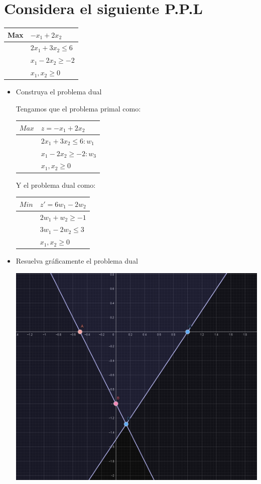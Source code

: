 \section{Considera el siguiente P.P.L}


    \begin{tabular}{|l|l|}
    \hline
        Max & $-x_1+2x_2$ \\ \hline
        ~ & $2x_1+3x_2\leq 6$ \\ \hline
        ~ & $x_1-2x_2\geq -2$\\ \hline
        ~ & $x_1,x_2\geq0$ \\ \hline
    \end{tabular}
    \begin{itemize}
        \item Construya el problema dual 
        
        Tengamos que el problema primal como:

    \begin{tabular}{|l|l|}
    \hline
        $Max$ & $z=-x_1+2x_2$ \\ \hline
         & $2x_1+3x_2\leq 6: w_1$ \\ \hline
         & $x_1-2x_2\geq -2: w_3$ \\ \hline
         & $x_1,x_2\geq0$ \\ \hline
    \end{tabular} 
    Y el problema dual como:
    \begin{tabular}{|l|l|}
    \hline
        $Min$ & $z'=6w_1-2w_2$ \\ \hline
         & $2w_1+w_2\geq -1$ \\ \hline
         & $3w_1-2w_2\leq 3$ \\ \hline
         & $x_1,x_2\geq0 $\\ \hline
    \end{tabular}    
        
    
        
        
        \item Resuelva gr\'aficamente el problema dual
        
        \includegraphics[scale=0.2]{Ejercicios/Imagenes/Ejercicio2a_2.png}
        

\end{itemize}
